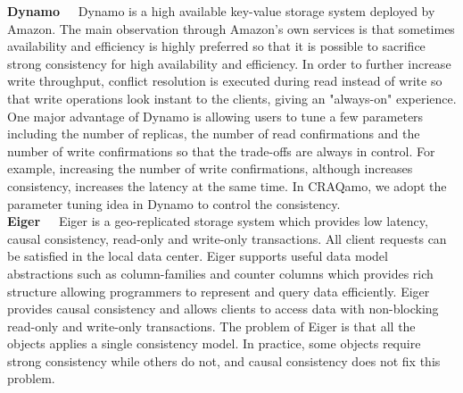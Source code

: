 {\noindent \bf Dynamo\ \ } Dynamo\cite{decandia2007dynamo} is a high available key-value storage system deployed by Amazon. The main observation through Amazon's own services is that sometimes availability and efficiency is highly preferred so that it is possible to sacrifice strong consistency for high availability and efficiency. In order to further increase write throughput, conflict resolution is executed during read instead of write so that write operations look instant to the clients, giving an "always-on" experience. One major advantage of Dynamo is allowing users to tune a few parameters including the number of replicas, the number of read confirmations and the number of write confirmations so that the trade-offs are always in control. For example, increasing the number of write confirmations, although increases consistency, increases the latency at the same time. In CRAQamo, we adopt the parameter tuning idea in Dynamo to control the consistency. \\

{\noindent \bf Eiger\ \ } Eiger\cite{lloyd2013stronger} is a geo-replicated storage system which provides low latency, causal consistency, read-only and write-only transactions. All client requests can be satisfied in the local data center. Eiger supports useful data model abstractions such as column-families and counter columns which provides rich structure allowing programmers to represent and query data efficiently. Eiger provides causal consistency and allows clients to access data with non-blocking read-only and write-only transactions. The problem of Eiger is that all the objects applies a single consistency model. In practice, some objects require strong consistency while others do not, and causal consistency does not fix this problem. 
\label{sec:related}


